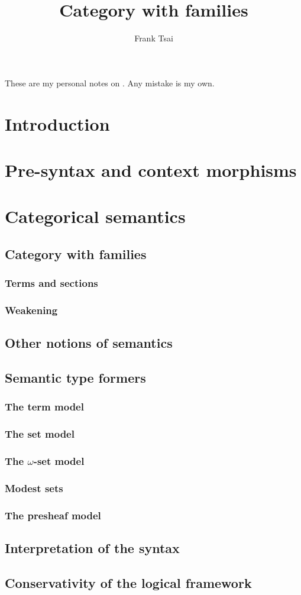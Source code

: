 \documentclass[a4paper]{article}
\title{Category with families}
\author{Frank Tsai}
\begin{document}
\maketitle

These are my personal notes on \cite{Hofmann1997}.
Any mistake is my own.

\section{Introduction}\label{sec:intro}

\section{Pre-syntax and context morphisms}\label{sec:pscm}
\section{Categorical semantics}\label{sec:cs}
\subsection{Category with families}\label{sec:cwf}
\subsubsection{Terms and sections}\label{sec:tas}
\subsubsection{Weakening}\label{sec:w}
\subsection{Other notions of semantics}\label{sec:onos}
\subsection{Semantic type formers}\label{sec:stf}
\subsubsection{The term model}\label{sec:ttm}
\subsubsection{The set model}\label{sec:tsm}
\subsubsection{The $\omega$-set model}\label{sec:twsm}
\subsubsection{Modest sets}\label{sec:ms}
\subsubsection{The presheaf model}\label{sec:tpm}
\subsection{Interpretation of the syntax}\label{sec:iots}
\subsection{Conservativity of the logical framework}\label{sec:cotlf}



\end{document}
